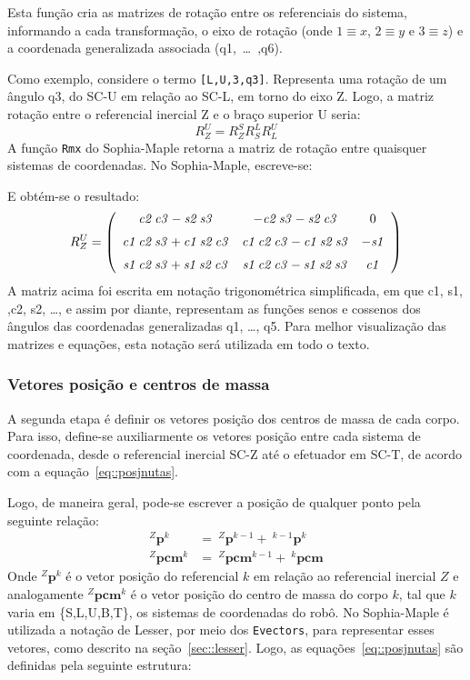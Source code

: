 Esta função cria as matrizes de rotação entre os referenciais do sistema,
informando a cada transformação, o eixo de rotação
(onde $1 \equiv x$, $2 \equiv y$ e $3 \equiv z$) e a coordenada generalizada
associada (q1,~\ldots~,q6).

Como exemplo, considere o termo {\tt [L,U,3,q3]}. Representa uma rotação de um
ângulo q3, do SC-U em relação ao SC-L, em torno do eixo Z.
Logo, a matriz rotação entre o referencial inercial Z e o braço
superior U seria:
%
$$ R_{Z}^{U} = R_{Z}^{S} R_{S}^{L} R_{L}^{U} $$
%
A função \texttt{Rmx} do Sophia-Maple retorna a matriz de rotação entre quaisquer
sistemas de coordenadas. No Sophia-Maple, escreve-se:

\bigskip {} \bigskip 

E obtém-se o resultado:
%
$$ R_{Z}^{U} = \left( \begin {array}{ccc} {\it c2}\,{\it c3}-{\it s2}\,{\it
s3}&-{ \it c2}\,{\it s3}-{\it s2}\,{\it c3}&0\\ \noalign{\medskip}{\it c1}\,{
\it c2}\,{\it s3}+{\it c1}\,{\it s2}\,{\it c3}&{\it c1}\,{\it c2}\,{
\it c3}-{\it c1}\,{\it s2}\,{\it s3}&-{\it s1}\\ \noalign{\medskip}{
\it s1}\,{\it c2}\,{\it s3}+{\it s1}\,{\it s2}\,{\it c3}&{\it s1}\,{
\it c2}\,{\it c3}-{\it s1}\,{\it s2}\,{\it s3}&{\it c1}\end {array}
 \right) $$
 A matriz acima foi escrita em notação trigonométrica simplificada, em que c1,
 s1, ,c2, s2, \ldots, e assim por diante, representam as funções senos e
 cossenos dos ângulos das coordenadas generalizadas q1, \ldots, q5. Para melhor
 visualização das matrizes e equações, esta notação será utilizada em todo o
 texto.
 
\subsubsection{Vetores posição e centros de massa}

A segunda etapa é definir os vetores posição dos centros de massa de cada corpo.
Para isso, define-se auxiliarmente os vetores posição entre cada sistema de
coordenada, desde o referencial inercial SC-Z até o efetuador em SC-T, de
acordo com a equação~\ref{eq::posjnutas}.

Logo, de maneira geral, pode-se escrever a posição de qualquer ponto pela
seguinte relação:
%
\begin{align}
	^{Z}\mathbf{p}^{k} &= ~^{Z}\mathbf{p}^{k-1} + ~^{k-1}\mathbf{p}^{k}
	\label{eq::posjnutas} \\
	^{Z}\mathbf{pcm}^{k} &= ~^{Z}\mathbf{pcm}^{k-1} + ~^{k}\mathbf{pcm}
	\label{eq::pcm}
\end{align}
%
Onde $^{Z}\mathbf{p}^{k}$ é o vetor posição do referencial $k$ em relação ao
referencial inercial $Z$ e analogamente $^{Z}\mathbf{pcm}^{k}$ é o vetor
posição do centro de massa do corpo $k$, tal que $k$ varia em \{S,L,U,B,T\},
os sistemas de coordenadas do robô.
No Sophia-Maple é utilizada a notação de Lesser, por meio dos \texttt{Evectors},
para representar esses vetores, como descrito na seção~\ref{sec::lesser}. Logo,
as equações~\ref{eq::posjnutas} são definidas pela seguinte
estrutura:

